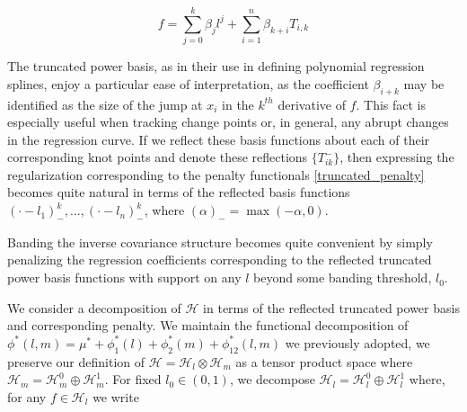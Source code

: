 \documentclass[12pt]{article}
\theoremstyle{definition}
\begin{document}
\[
f = \sum_{j=0}^k \beta_j l^j + \sum_{i=1}^n \beta_{k+i} T_{i,k}
\]
\noindent

The truncated power basis, as in their use in defining polynomial regression splines, enjoy a particular ease of interpretation, as the coefficient $\beta_{i+k}$ may be identified as the size of the jump at $x_i$ in the $k^{th}$ derivative of $f$. This fact is especially useful when tracking change points or, in general, any abrupt changes in the regression curve. If we reflect these basis functions about each of their corresponding knot points and denote these reflections $\lbrace T^-_{ik}\rbrace$, then expressing the regularization corresponding to the penalty functionals \eqref{truncated_penalty} becomes quite natural in terms of the reflected basis functions $\left(\cdot - l_1 \right)^k_-,\dots, \left(\cdot - l_n \right)^k_-$, where $\left( \alpha \right)_- = \max\left(-\alpha,0\right)$.

Banding the inverse covariance structure becomes quite convenient by simply penalizing the regression coefficients corresponding to the reflected truncated power basis functions with support on any $l$ beyond some banding threshold, $l_0$. 

We consider a decomposition of $\mathcal{H}$ in terms of the reflected truncated power basis and corresponding penalty. We maintain the functional decomposition of $\phi^*\left(l,m\right) = \mu^* + \phi^*_1\left(l\right) + \phi^*_2\left(m\right) + \phi^*_{12}\left(l,m\right)$ we previously adopted, we preserve our definition of $\mathcal{H} = \mathcal{H}_l\otimes \mathcal{H}_m$ as a tensor product space where $\mathcal{H}_m = \mathcal{H}_m^0 \oplus \mathcal{H}_m^1$. For fixed $l_0\in\left(0,1\right)$, we decompose $\mathcal{H}_l = \mathcal{H}_l^0 \oplus \mathcal{H}_l^1$ where, for any $f \in \mathcal{H}_l$ we write
\end{document}
